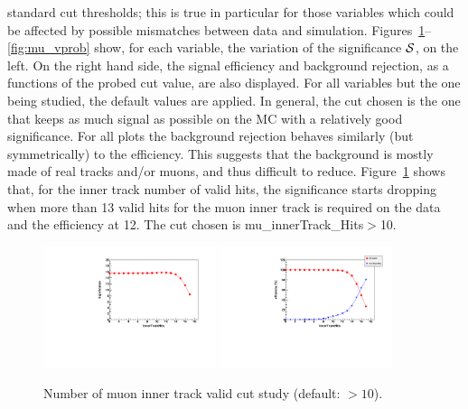 standard cut thresholds; this is true in particular for those variables which could be affected by possible mismatches between data and simulation. 
Figures~\ref{fig:mu_inner_track_hit}--\ref{fig:mu_vprob} show, for each variable, the variation of the significance ${\cal{S}}$, on the left.  %
On the right hand side,  the signal efficiency and background rejection, %
as a functions of the probed cut value, are also displayed. 
For all variables but the one being studied, the default values are applied. 
In general, the cut chosen is the one that keeps as much signal as possible on the MC with a relatively good significance. For all plots the background rejection behaves similarly 
(but symmetrically) to the efficiency. This suggests that the background is mostly made of real tracks and/or muons, and thus difficult to reduce.
Figure~\ref{fig:mu_inner_track_hit} shows that, for the inner track number of valid hits, the significance starts dropping when more than 13 valid hits for the muon inner track is required on 
the data and the efficiency at 12. The cut chosen is mu\_innerTrack\_Hits$>$10.
%
\begin{figure}[h!]
 \begin{center}
   \includegraphics[angle=0,width=0.45\textwidth]{chap_YInPbPbColl2011_figures/InTrackHits_Significance1} 
   \includegraphics[angle=0,width=0.45\textwidth]{chap_YInPbPbColl2011_figures/InTrackHits_SigBkgRejEff}
   \caption{Number of muon inner track valid cut study (default: $>10$).}
   \label{fig:mu_inner_track_hit}
 \end{center}
\end{figure}

